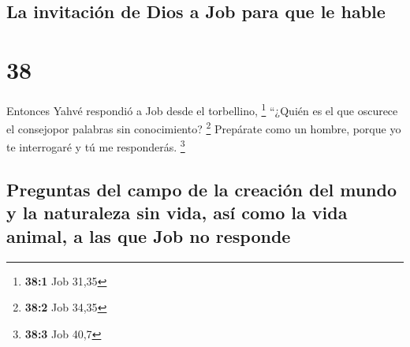 \begin{paracol}{2}
\hypertarget{la-invitaciuxf3n-de-dios-a-job-para-que-le-hable}{%
\subsection{La invitación de Dios a Job para que le
hable}\label{la-invitaciuxf3n-de-dios-a-job-para-que-le-hable}}

\hypertarget{section-74}{%
\section{38}\label{section-74}}

 Entonces Yahvé respondió a Job desde el torbellino,
\footnote{\textbf{38:1} Job 31,35}  ``¿Quién es el que
oscurece el consejopor palabras sin conocimiento? \footnote{\textbf{38:2}
  Job 34,35}  Prepárate como un hombre, porque yo te
interrogaré y tú me responderás. \footnote{\textbf{38:3} Job 40,7}

\hypertarget{preguntas-del-campo-de-la-creaciuxf3n-del-mundo-y-la-naturaleza-sin-vida-asuxed-como-la-vida-animal-a-las-que-job-no-responde}{%
\subsection{Preguntas del campo de la creación del mundo y la naturaleza
sin vida, así como la vida animal, a las que Job no
responde}\label{preguntas-del-campo-de-la-creaciuxf3n-del-mundo-y-la-naturaleza-sin-vida-asuxed-como-la-vida-animal-a-las-que-job-no-responde}}


\end{paracol}
